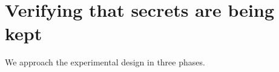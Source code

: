 \documentclass[11pt]{article}
\begin{document}
\section{Verifying that secrets are being kept} \label{experiment}
We approach the experimental design in three phases. %


%
\end{document}
